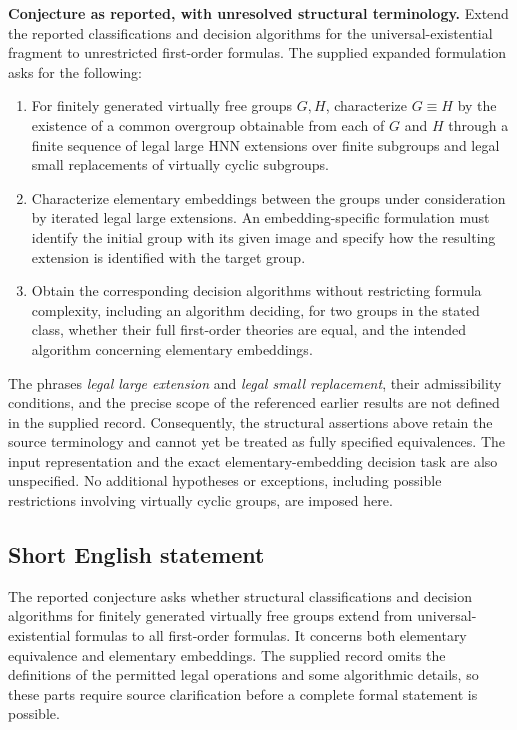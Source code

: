 \documentclass[11pt]{article}
\begin{document}
\textbf{Conjecture as reported, with unresolved structural terminology.} Extend the reported classifications and decision algorithms for the universal-existential fragment to unrestricted first-order formulas. The supplied expanded formulation asks for the following:
\begin{enumerate}
\item For finitely generated virtually free groups \(G,H\), characterize \(G\equiv H\) by the existence of a common overgroup obtainable from each of \(G\) and \(H\) through a finite sequence of legal large HNN extensions over finite subgroups and legal small replacements of virtually cyclic subgroups.
\item Characterize elementary embeddings between the groups under consideration by iterated legal large extensions. An embedding-specific formulation must identify the initial group with its given image and specify how the resulting extension is identified with the target group.
\item Obtain the corresponding decision algorithms without restricting formula complexity, including an algorithm deciding, for two groups in the stated class, whether their full first-order theories are equal, and the intended algorithm concerning elementary embeddings.
\end{enumerate}
The phrases \emph{legal large extension} and \emph{legal small replacement}, their admissibility conditions, and the precise scope of the referenced earlier results are not defined in the supplied record. Consequently, the structural assertions above retain the source terminology and cannot yet be treated as fully specified equivalences. The input representation and the exact elementary-embedding decision task are also unspecified. No additional hypotheses or exceptions, including possible restrictions involving virtually cyclic groups, are imposed here.
\subsection{Short English statement}
The reported conjecture asks whether structural classifications and decision algorithms for finitely generated virtually free groups extend from universal-existential formulas to all first-order formulas. It concerns both elementary equivalence and elementary embeddings. The supplied record omits the definitions of the permitted legal operations and some algorithmic details, so these parts require source clarification before a complete formal statement is possible.
\end{document}

